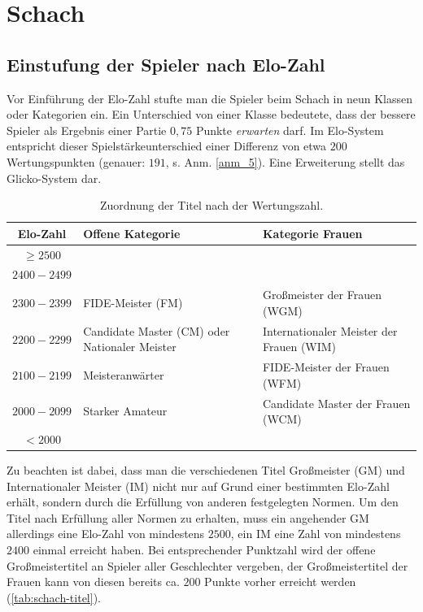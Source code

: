 \chapter{Schach}

\section{Einstufung der Spieler nach Elo-Zahl}

Vor Einführung der Elo-Zahl stufte man die Spieler beim Schach in neun Klassen oder Kategorien ein. Ein Unterschied von einer Klasse bedeutete, dass der bessere Spieler als Ergebnis einer Partie $0,75$ Punkte \textit{erwarten} darf. Im Elo-System entspricht dieser Spielstärkeunterschied einer Differenz von etwa $200$ Wertungspunkten (genauer: $191$, s. Anm. \ref{anm_5}). Eine Erweiterung stellt das Glicko-System dar.

\begin{table}[htbp]
    \centering
    \begin{tabular}{c >{\centering\arraybackslash}p{6.2cm} >{\centering\arraybackslash}p{6.2cm}}
        \toprule
        \textbf{Elo-Zahl} & \textbf{Offene Kategorie} & \textbf{Kategorie Frauen} \\
        \midrule
        $\geq 2500$     & \multicolumn{2}{c}{Großmeister (GM)} \\
        $2400 - 2499$  & \multicolumn{2}{c}{Internationaler Meister (IM)} \\
        $2300 - 2399$  & FIDE-Meister (FM) & Großmeister der Frauen (WGM) \\
        $2200 - 2299$  & Candidate Master (CM) oder Nationaler Meister & Internationaler Meister der Frauen (WIM) \\
        $2100 - 2199$  & Meisteranwärter & FIDE-Meister der Frauen (WFM) \\
        $2000 - 2099$  & Starker Amateur & Candidate Master der Frauen (WCM) \\
        $< 2000$        &  \multicolumn{2}{c}{Amateur} \\
        \bottomrule
    \end{tabular}
    \caption{Zuordnung der Titel nach der Wertungszahl.}
    \label{tab:schach-titel}
\end{table}

Zu beachten ist dabei, dass man die verschiedenen Titel Großmeister (GM) und Internationaler Meister (IM) nicht nur auf Grund einer bestimmten Elo-Zahl erhält, sondern durch die Erfüllung von anderen festgelegten Normen. Um den Titel nach Erfüllung aller Normen zu erhalten, muss ein angehender GM allerdings eine Elo-Zahl von mindestens $2500$, ein IM eine Zahl von mindestens $2400$ einmal erreicht haben. Bei entsprechender Punktzahl wird der offene Großmeistertitel an Spieler aller Geschlechter vergeben, der Großmeistertitel der Frauen kann von diesen bereits ca. $200$ Punkte vorher erreicht werden (\autoref{tab:schach-titel}).

